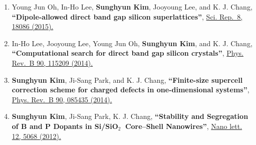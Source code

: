 \begin{enumerate}
{  Rev.~B 93, 085201 (2016).}
\item
  Young Jun Oh, In-Ho Lee, \textbf{Sunghyun Kim}, Jooyoung Lee, and K.
  J. Chang, \textbf{``Dipole-allowed direct band gap silicon
  superlattices''}, \href{http://dx.doi.org/10.1038/srep18086}{Sci.
  Rep.~8, 18086 (2015).}
\item
  In-Ho Lee, Jooyoung Lee, Young Jun Oh, \textbf{Sunghyun Kim}, and K.
  J. Chang, \textbf{``Computational search for direct band gap silicon
  crystals''},
  \href{http://journals.aps.org/prb/abstract/10.1103/PhysRevB.90.115209}{Phys.
  Rev.~B 90, 115209 (2014).}
\item
  \textbf{Sunghyun Kim}, Ji-Sang Park, and K. J. Chang,
  \textbf{``Finite-size supercell correction scheme for charged defects
  in one-dimensional systems''},
  \href{http://journals.aps.org/prb/abstract/10.1103/PhysRevB.90.085435}{Phys.
  Rev.~B 90, 085435 (2014).}
\item
  \textbf{Sunghyun Kim}, Ji-Sang Park, K. J. Chang, \textbf{``Stability
  and Segregation of B and P Dopants in Si/SiO\(_2~\) Core--Shell
  Nanowires''},
  \href{http://pubs.acs.org/doi/abs/10.1021/nl3013924}{Nano lett. 12,
  5068 (2012).}
\end{enumerate}
